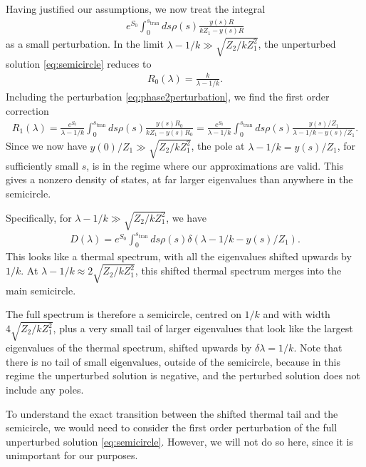 \documentclass[12pt]{article}
\newcommand{\stran}{s_{\text{tran}}}
\numberwithin{equation}{section}
\begin{document}
Having justified our assumptions, we now treat the integral
\begin{align} \label{eq:phase2perturbation}
e^{S_0}\int_0^{\stran} ds \rho(s) \frac{y(s) R}{k Z_1 - y(s) R}
\end{align}
as a small perturbation. In the limit $\lambda - 1/k \gg \sqrt{Z_2 / k Z_1^2}$, the unperturbed solution \eqref{eq:semicircle} reduces to
\begin{align}
R_0 (\lambda) = \frac{k}{\lambda - 1/k}.
\end{align}
Including the perturbation \eqref{eq:phase2perturbation}, we find the first order correction
\begin{align} \label{eq:R1lambda}
R_1(\lambda) = \frac{ e^{S_0}}{\lambda - 1/k }\int_0^{\stran} ds \rho(s) \frac{y(s) R_0}{k Z_1 - y(s) R_0} = \frac{e^{S_0}}{\lambda - 1/k}\int_0^{\stran} ds \rho(s) \frac{y(s) /Z_1}{\lambda - 1/k - y(s)/ Z_1}.
\end{align}
Since we now have $y(0)/Z_1 \gg \sqrt{Z_2 / k Z_1^2}$, the pole at $\lambda - 1/k = y(s)/ Z_1$, for sufficiently small $s$, is in the regime where our approximations are valid. This gives a nonzero density of states, at far larger eigenvalues than anywhere in the semicircle. 

Specifically, for $\lambda - 1/k \gg \sqrt{Z_2 / k Z_1^2}$, we have
\begin{align} \label{eq:shiftedthermaltail}
D(\lambda) = e^{S_0} \int_0^{\stran} ds \rho(s) \delta( \lambda - 1/k - y(s)/ Z_1).
\end{align}
This looks like a thermal spectrum, with all the eigenvalues shifted upwards by $1/k$. At $\lambda - 1/k \approx 2 \sqrt{Z_2 / k Z_1^2}$, this shifted thermal spectrum merges into the main semicircle. 

The full spectrum is therefore a semicircle, centred on $1/k$ and with width $4 \sqrt{ Z_2 / k Z_1^2}$, plus a very small tail of larger eigenvalues that look like the largest eigenvalues of the thermal spectrum, shifted upwards by $\delta \lambda = 1/k$. Note that there is no tail of small eigenvalues, outside of the semicircle, because in this regime the unperturbed solution is negative, and the perturbed solution does not include any poles.

To understand the exact transition between the shifted thermal tail and the semicircle, we would need to consider the first order perturbation of the full unperturbed solution \eqref{eq:semicircle}. However, we will not do so here, since it is unimportant for our purposes. 
\end{document}
